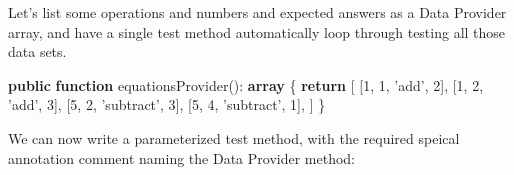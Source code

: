 \documentclass[a4paperpaper,openright]{book}
\newenvironment{Shaded}{}{}
\newcommand{\DecValTok}[1]{\textcolor[rgb]{0.25,0.63,0.44}{#1}}
\newcommand{\KeywordTok}[1]{\textcolor[rgb]{0.00,0.44,0.13}{\textbf{#1}}}
\newcommand{\NormalTok}[1]{#1}
\newcommand{\OtherTok}[1]{\textcolor[rgb]{0.00,0.44,0.13}{#1}}
\newcommand{\StringTok}[1]{\textcolor[rgb]{0.25,0.44,0.63}{#1}}
\begin{document}
Let's list some operations and numbers and expected answers as a Data
Provider array, and have a single test method automatically loop through
testing all those data sets.

\begin{Shaded}
\begin{Highlighting}[]
    \KeywordTok{public} \KeywordTok{function}\NormalTok{ equationsProvider}\OtherTok{()}\NormalTok{: }\KeywordTok{array}
\NormalTok{    \{}
        \KeywordTok{return} \OtherTok{[}
            \OtherTok{[}\DecValTok{1}\OtherTok{,} \DecValTok{1}\OtherTok{,} \StringTok{'add'}\OtherTok{,} \DecValTok{2}\OtherTok{],}
            \OtherTok{[}\DecValTok{1}\OtherTok{,} \DecValTok{2}\OtherTok{,} \StringTok{'add'}\OtherTok{,} \DecValTok{3}\OtherTok{],}
            \OtherTok{[}\DecValTok{5}\OtherTok{,} \DecValTok{2}\OtherTok{,} \StringTok{'subtract'}\OtherTok{,} \DecValTok{3}\OtherTok{],}
            \OtherTok{[}\DecValTok{5}\OtherTok{,} \DecValTok{4}\OtherTok{,} \StringTok{'subtract'}\OtherTok{,} \DecValTok{1}\OtherTok{],}
        \OtherTok{]}
\NormalTok{    \}}
\end{Highlighting}
\end{Shaded}

We can now write a parameterized test method, with the required speical
annotation comment naming the Data Provider method:
\end{document}
